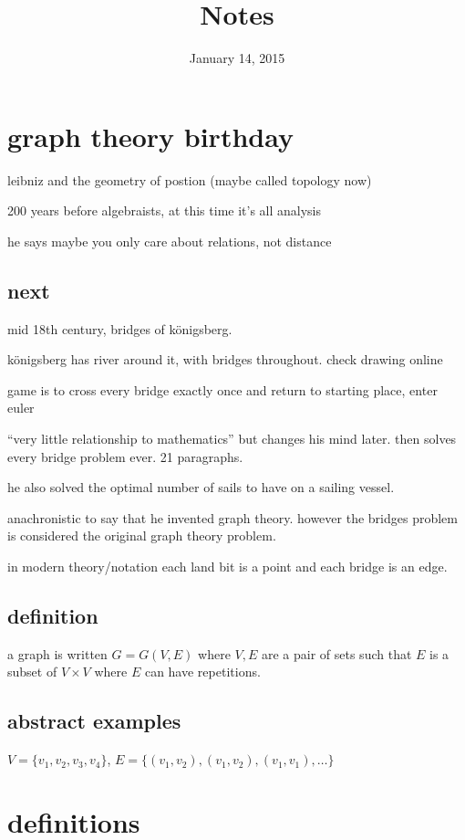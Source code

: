 \documentclass[letterpaper]{article}
\begin{document}
\title{Notes}
\date{January 14, 2015}
\maketitle
\section*{graph theory birthday}
leibniz and the geometry of postion (maybe called topology now)

200 years before algebraists, at this time it's all analysis

he says maybe you only care about relations, not distance

\subsection*{next}
mid 18th century, bridges of königsberg.

königsberg has river around it, with bridges throughout. check drawing online

game is to cross every bridge exactly once and return to starting place, enter euler

``very  little relationship to mathematics'' but changes his mind later. then solves every bridge problem ever. 21 paragraphs.

he also solved the optimal number of sails to have on a sailing vessel.

anachronistic to say that he invented graph theory. however the bridges problem is considered the original graph theory problem.

in modern theory/notation each land bit is a point and each bridge is an edge.

\subsection*{definition}
a graph is written $G=G(V,E)$ where $V, E$ are a pair of sets such that $E$ is a subset of $V\times V$ where $E$ can have repetitions.

\subsection*{abstract examples}
$V=\{v_1,v_2,v_3,v_4\}$, $E=\{(v_1,v_2),(v_1,v_2), (v_1,v_1), \dots\}$

\section*{definitions}
\end{document}

